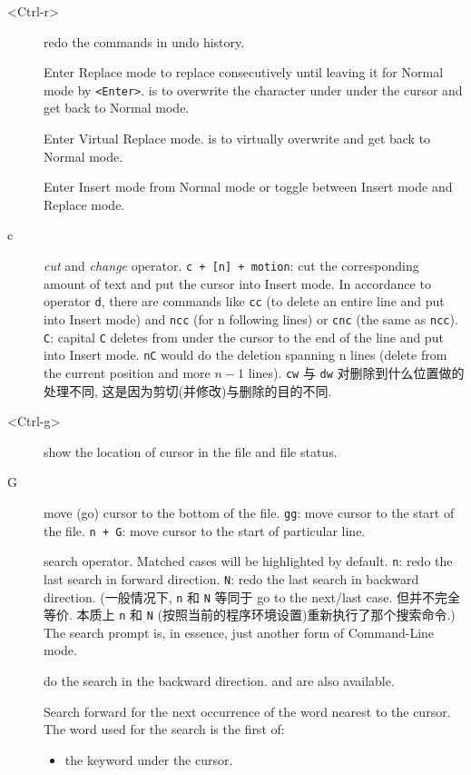 \begin{description}
\item[<Ctrl-r>] redo the commands in undo history.
\item[] Enter Replace mode to replace consecutively until leaving it for Normal mode by \texttt{<Enter>}.  is to overwrite the character under under the cursor and get back to Normal mode.
\item[] Enter Virtual Replace mode.  is to virtually overwrite and get back to Normal mode.
\item[] Enter Insert mode from Normal mode or toggle between Insert mode and Replace mode.
\item[c] \emph{cut} and \emph{change} operator. \texttt{c + [n] + motion}: cut the corresponding amount of text and put the cursor into Insert mode. In accordance to operator \verb|d|, there are commands like \texttt{cc} (to delete an entire line and put into Insert mode) and \texttt{ncc} (for n following lines) or \texttt{cnc} (the same as \verb|ncc|). \texttt{C}: capital \verb|C| deletes from under the cursor to the end of the line and put into Insert mode. \verb|nC| would do the deletion spanning n lines (delete from the current position and more $n-1$ lines).
\texttt{cw} 与 \texttt{dw} 对删除到什么位置做的处理不同, 这是因为剪切(并修改)与删除的目的不同.
\item[<Ctrl-g>] show the location of cursor in the file and file status.
\item[G] move (go) cursor to the bottom of the file. \texttt{gg}: move cursor to the start of the file. \texttt{n + G}: move cursor to the start of particular line.
\item[] search operator. Matched cases will be highlighted by default. \texttt{n}: redo the last search in forward direction. \texttt{N}: redo the last search in backward direction. 
(一般情况下, \texttt{n} 和 \texttt{N} 等同于 go to the next/last case. 但并不完全等价. 本质上 \texttt{n} 和 \texttt{N} (按照当前的程序环境设置)重新执行了那个搜索命令.) The search prompt is, in essence, just another form of Command-Line mode.
\item[] do the search in the backward direction.  and  are also available.
\item[\syntax{*}] Search forward for the next occurrence of the word nearest to the cursor. The word used for the search is the first of:
\begin{itemize}
  \item the keyword under the cursor.

\end{itemize}
\end{description}

